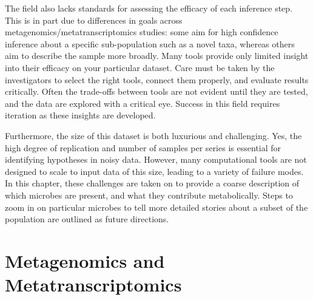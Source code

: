 The field also lacks standards for assessing the efficacy of each inference step.
This is in part due to differences in goals across metagenomics/metatranscriptomics studies: some aim for high confidence inference about a specific sub-population such as a novel taxa, whereas others aim to describe the sample more broadly.
Many tools provide only limited insight into their efficacy on your particular dataset.
Care must be taken by the investigators to select the right tools, connect them properly, and evaluate results critically.
Often the trade-offs between tools are not evident until they are tested, and the data are explored with a critical eye.
Success in this field requires iteration as these insights are developed.

Furthermore, the size of this dataset is both luxurious and challenging.
Yes, the high degree of replication and number of samples per series is essential for identifying hypotheses in noisy data.
However, many computational tools are not designed to scale to input data of this size, leading to a variety of failure modes. %
In this chapter, these challenges are taken on to provide a coarse description of which microbes are present, and what they contribute metabolically.
Steps to zoom in on particular microbes to tell more detailed stories about a subset of the population are outlined as future directions.


\section{Metagenomics and Metatranscriptomics}

